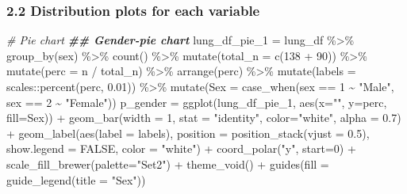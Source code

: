 \documentclass[
]{article}
\newenvironment{Shaded}{\begin{snugshade}}{\end{snugshade}}
\newcommand{\AttributeTok}[1]{\textcolor[rgb]{0.77,0.63,0.00}{#1}}
\newcommand{\CommentTok}[1]{\textcolor[rgb]{0.56,0.35,0.01}{\textit{#1}}}
\newcommand{\ConstantTok}[1]{\textcolor[rgb]{0.00,0.00,0.00}{#1}}
\newcommand{\DecValTok}[1]{\textcolor[rgb]{0.00,0.00,0.81}{#1}}
\newcommand{\DocumentationTok}[1]{\textcolor[rgb]{0.56,0.35,0.01}{\textbf{\textit{#1}}}}
\newcommand{\FloatTok}[1]{\textcolor[rgb]{0.00,0.00,0.81}{#1}}
\newcommand{\FunctionTok}[1]{\textcolor[rgb]{0.00,0.00,0.00}{#1}}
\newcommand{\NormalTok}[1]{#1}
\newcommand{\OtherTok}[1]{\textcolor[rgb]{0.56,0.35,0.01}{#1}}
\newcommand{\SpecialCharTok}[1]{\textcolor[rgb]{0.00,0.00,0.00}{#1}}
\newcommand{\StringTok}[1]{\textcolor[rgb]{0.31,0.60,0.02}{#1}}
\begin{document}
\hypertarget{distribution-plots-for-each-variable}{%
\subsubsection{2.2 Distribution plots for each
variable}\label{distribution-plots-for-each-variable}}

\begin{Shaded}
\begin{Highlighting}[]
\CommentTok{\# Pie chart}
\DocumentationTok{\#\# Gender{-}pie chart}
\NormalTok{lung\_df\_pie\_1 }\OtherTok{=} 
\NormalTok{  lung\_df }\SpecialCharTok{\%\textgreater{}\%} 
  \FunctionTok{group\_by}\NormalTok{(sex) }\SpecialCharTok{\%\textgreater{}\%} 
  \FunctionTok{count}\NormalTok{() }\SpecialCharTok{\%\textgreater{}\%} 
  \FunctionTok{mutate}\NormalTok{(}\AttributeTok{total\_n =} \FunctionTok{c}\NormalTok{(}\DecValTok{138} \SpecialCharTok{+} \DecValTok{90}\NormalTok{)) }\SpecialCharTok{\%\textgreater{}\%} 
  \FunctionTok{mutate}\NormalTok{(}\AttributeTok{perc =} \StringTok{\textasciigrave{}}\AttributeTok{n}\StringTok{\textasciigrave{}} \SpecialCharTok{/} \StringTok{\textasciigrave{}}\AttributeTok{total\_n}\StringTok{\textasciigrave{}}\NormalTok{) }\SpecialCharTok{\%\textgreater{}\%} 
  \FunctionTok{arrange}\NormalTok{(perc) }\SpecialCharTok{\%\textgreater{}\%}
  \FunctionTok{mutate}\NormalTok{(}\AttributeTok{labels =}\NormalTok{ scales}\SpecialCharTok{::}\FunctionTok{percent}\NormalTok{(perc, }\FloatTok{0.01}\NormalTok{)) }\SpecialCharTok{\%\textgreater{}\%}
  \FunctionTok{mutate}\NormalTok{(}\AttributeTok{Sex =} \FunctionTok{case\_when}\NormalTok{(sex }\SpecialCharTok{==} \DecValTok{1} \SpecialCharTok{\textasciitilde{}} \StringTok{"Male"}\NormalTok{,}
\NormalTok{                         sex }\SpecialCharTok{==} \DecValTok{2} \SpecialCharTok{\textasciitilde{}} \StringTok{"Female"}\NormalTok{)) }
\NormalTok{p\_gender }\OtherTok{=}
  \FunctionTok{ggplot}\NormalTok{(lung\_df\_pie\_1, }\FunctionTok{aes}\NormalTok{(}\AttributeTok{x=}\StringTok{""}\NormalTok{, }\AttributeTok{y=}\NormalTok{perc, }\AttributeTok{fill=}\NormalTok{Sex)) }\SpecialCharTok{+} 
  \FunctionTok{geom\_bar}\NormalTok{(}\AttributeTok{width =} \DecValTok{1}\NormalTok{, }\AttributeTok{stat =} \StringTok{"identity"}\NormalTok{, }\AttributeTok{color=}\StringTok{"white"}\NormalTok{, }\AttributeTok{alpha =} \FloatTok{0.7}\NormalTok{) }\SpecialCharTok{+} 
  \FunctionTok{geom\_label}\NormalTok{(}\FunctionTok{aes}\NormalTok{(}\AttributeTok{label =}\NormalTok{ labels),}
             \AttributeTok{position =} \FunctionTok{position\_stack}\NormalTok{(}\AttributeTok{vjust =} \FloatTok{0.5}\NormalTok{),}
             \AttributeTok{show.legend =} \ConstantTok{FALSE}\NormalTok{,}
             \AttributeTok{color =} \StringTok{"white"}\NormalTok{) }\SpecialCharTok{+}
  \FunctionTok{coord\_polar}\NormalTok{(}\StringTok{"y"}\NormalTok{, }\AttributeTok{start=}\DecValTok{0}\NormalTok{) }\SpecialCharTok{+}
  \FunctionTok{scale\_fill\_brewer}\NormalTok{(}\AttributeTok{palette=}\StringTok{"Set2"}\NormalTok{) }\SpecialCharTok{+}
  \FunctionTok{theme\_void}\NormalTok{() }\SpecialCharTok{+}
  \FunctionTok{guides}\NormalTok{(}\AttributeTok{fill =} \FunctionTok{guide\_legend}\NormalTok{(}\AttributeTok{title =} \StringTok{"Sex"}\NormalTok{)) }


\end{Highlighting}
\end{Shaded}
\end{document}
